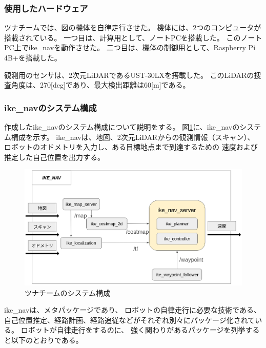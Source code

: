 \documentclass[twocolumn,9pt]{jsproceedings}
\begin{document}
\subsubsection{使用したハードウェア}
ツナチームでは、図の機体を自律走行させた。
機体には、2つのコンピュータが搭載されている。
一つ目は、計算用として、ノートPCを搭載した。
このノートPC上でike\_navを動作させた。
二つ目は、機体の制御用として、Raspberry Pi 4B+を搭載した。

観測用のセンサは、2次元LiDARであるUST-30LX\cite{UST-30LX}を搭載した。
このLiDARの捜査角度は、270[deg]であり、最大検出距離は60[m]である。


\subsubsection{ike\_navのシステム構成}

作成したike\_navのシステム構成について説明をする。
図\ref{fig:tuna_system}に、ike\_navのシステム構成を示す。
ike\_navは、地図、2次元LiDARからの観測情報（スキャン）、
ロボットのオドメトリを入力し、ある目標地点まで到達するための
速度および推定した自己位置を出力する。

\begin{figure}[h]
  \begin{center}
    \includegraphics[width=1.0\linewidth]{figs/ike_nav.pdf}
    \caption{ツナチームのシステム構成}
    \label{fig:tuna_system}
  \end{center}
\end{figure}

ike\_navは、メタパッケージであり、
ロボットの自律走行に必要な技術である、
自己位置推定、経路計画、経路追従などがそれぞれ別々にパッケージ化されている。
ロボットが自律走行をするのに、
強く関わりがあるパッケージを列挙すると以下のとおりである。
\end{document}
